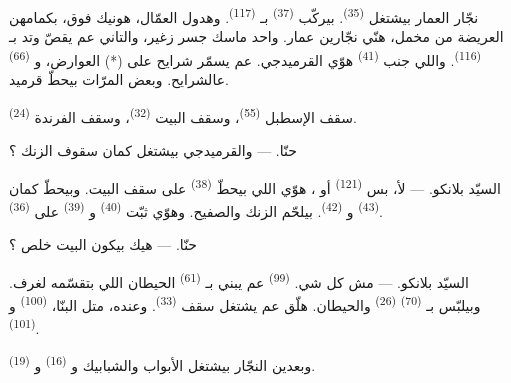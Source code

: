 نجّار العمار بيشتغل  \textsuperscript{(35)}. بيركّب
 \textsuperscript{(37)} بـ \textsuperscript{(117)}.
وهدول العمّال، هونيك فوق، بكمامهن العريضة من مخمل، هنّي نجّارين عمار.
واحد ماسك جسر زغير، والتاني عم يقصّ وتد بـ
\textsuperscript{(116)}. واللي جنب  \textsuperscript{(41)} هوّي
القرميدجي. عم يسمّر شرايح على (*) العوارض، و \textsuperscript{(66)} عالشرايح.
وبعض المرّات بيحطّ قرميد.


سقف الإسطبل  \textsuperscript{(55)}، وسقف البيت
 \textsuperscript{(32)}، وسقف الفرندة  \textsuperscript{(24)}.

\textsc{حنّا}. --- والقرميدجي بيشتغل كمان سقوف الزنك ؟

\textsc{السيّد بلانكو}. --- لأ، بس 
\textsuperscript{(121)} أو ، هوّي اللي بيحطّ
 \textsuperscript{(38)} على سقف البيت. وبيحطّ كمان
 \textsuperscript{(43)} و
\textsuperscript{(42)}. بيلحّم الزنك والصفيح. وهوّي ثبّت  \textsuperscript{(40)} و \textsuperscript{(39)}
على  \textsuperscript{(36)}.

\textsc{حنّا}. --- هيك بيكون البيت خلص ؟

\VUsaut{3.0mm}
\VUsaut{3.0mm}

\textsc{السيّد بلانكو}. --- مش كل شي. 
\textsuperscript{(99)} عم يبني بـ \textsuperscript{(61)}
الحيطان اللي بتقسّمه لغرف. وبيلبّس بـ \textsuperscript{(70)}
 \textsuperscript{(26)} والحيطان. هلّق عم يشتغل سقف
 \textsuperscript{(33)}. وعنده، متل البنّا، 
\textsuperscript{(100)} و \textsuperscript{(101)}.

وبعدين النجّار بيشتغل الأبواب والشبابيك و
\textsuperscript{(16)} و \textsuperscript{(19)}.

